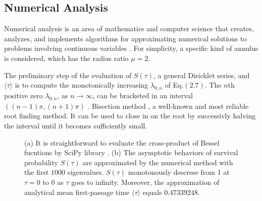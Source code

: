 
\newpage

\subsection{Numerical Analysis}

Numerical analysis is an area of mathematics and computer science that
creates, analyzes, and implements algorithms for approximating
numerical solutions to problems involving continuous variables
\cite{brezinski2012numerical}. For simplicity, a specific kind of
annulus is considered, which has the radius ratio $\mu=2$. 

The preliminary step of the evaluation of $S(\tau)$, a general
Dirichlet series, and $\langle \tau \rangle$ is to compute the
monotonically increasing $\lambda_{0,n}$ of Eq.$(2.7)$. The $n$th
positive zero $\lambda_{0,n}$, as $n \rightarrow \infty $, can be
bracketed in an interval $((n-1) \pi, (n+1) \pi)$
\cite{NIST:DLMF}. Bisection method \cite{2020SciPy-NMeth}, a
well-known and most reliable root finding method. It can be used to
close in on the root by successivly halving the interval until it
becomes sufficiently small.

\begin{figure}[h!]
  \centering
  \subfloat[]{\texttt{[image: F0]}}%
  \caption{(a) It is straightforward to evaluate the cross-product of
    Bessel fucntions by SciPy library \cite{2020SciPy-NMeth}. (b) The
    asymptotic behaviors of survival probability $S(\tau)$ are
    approximated by the numerical method with the first $1000$
    eigenvalues. $S(\tau)$ monotonously descrese from 1 at $\tau=0$ to
    $0$ as $\tau$ goes to infinity. Moreover, the approximation of
    analytical mean first-passage time $\langle \tau \rangle$ equals
    $0.47339248$.}
\end{figure}




